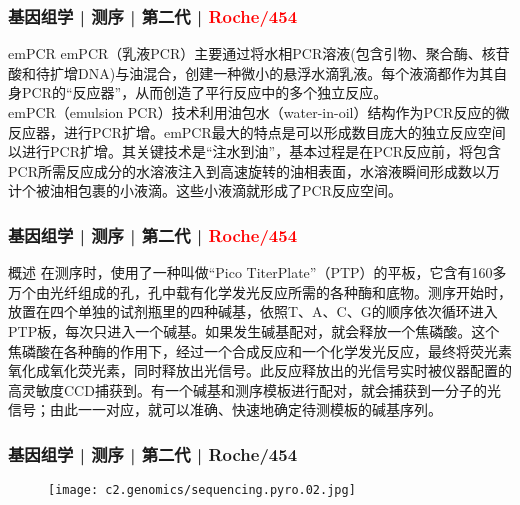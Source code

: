 \begin{frame}
  \frametitle{基因组学 | 测序 | 第二代 | \textcolor{red}{Roche/454}}
  \begin{block}{emPCR}
emPCR（乳液PCR）主要通过将水相PCR溶液(包含引物、聚合酶、核苷酸和待扩增DNA)与油混合，创建一种微小的悬浮水滴乳液。每个液滴都作为其自身PCR的“反应器”，从而创造了平行反应中的多个独立反应。\\
\vspace{1em}
emPCR（emulsion PCR）技术利用油包水（water-in-oil）结构作为PCR反应的微反应器，进行PCR扩增。emPCR最大的特点是可以形成数目庞大的独立反应空间以进行PCR扩增。其关键技术是“注水到油”，基本过程是在PCR反应前，将包含PCR所需反应成分的水溶液注入到高速旋转的油相表面，水溶液瞬间形成数以万计个被油相包裹的小液滴。这些小液滴就形成了PCR反应空间。
  \end{block}
\end{frame}

\begin{frame}
  \frametitle{基因组学 | 测序 | 第二代 | \textcolor{red}{Roche/454}}
  \begin{block}{概述}
在测序时，使用了一种叫做“Pico TiterPlate”（PTP）的平板，它含有160多万个由光纤组成的孔，孔中载有化学发光反应所需的各种酶和底物。测序开始时，放置在四个单独的试剂瓶里的四种碱基，依照T、A、C、G的顺序依次循环进入PTP板，每次只进入一个碱基。如果发生碱基配对，就会释放一个焦磷酸。这个焦磷酸在各种酶的作用下，经过一个合成反应和一个化学发光反应，最终将荧光素氧化成氧化荧光素，同时释放出光信号。此反应释放出的光信号实时被仪器配置的高灵敏度CCD捕获到。有一个碱基和测序模板进行配对，就会捕获到一分子的光信号；由此一一对应，就可以准确、快速地确定待测模板的碱基序列。
  \end{block}
\end{frame}


\begin{frame}
  \frametitle{基因组学 | 测序 | 第二代 | Roche/454}
  \begin{figure}
    \centering
    \texttt{[image: c2.genomics/sequencing.pyro.02.jpg]}
  \end{figure}
\end{frame}

